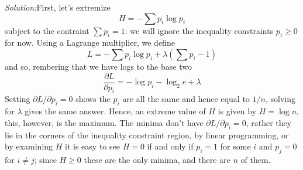 \documentclass[12pt]{article}
\newcommand{\soln}{\noindent\textit{Solution:}}
\begin{document}
\begin{enumerate}
\soln First, let's extremize 
\begin{equation}
H=-\sum p_i\log p_i
\end{equation}
subject to the contraint $\sum p_i=1$: we will ignore the inequality constraints $p_i\ge 0$ for now. Using a Lagrange multiplier, we define
\begin{equation}
L=-\sum p_i\log p_i+\lambda \left(\sum p_i-1\right)
\end{equation}
and so, rembering that we have logs to the base two
\begin{equation}
\frac{\partial L}{\partial p_i}=-\log p_i -\log_2e+\lambda
\end{equation}
Setting $\partial L/\partial p_i=0$ shows the $p_i$ are all the same
and hence equal to $1/n$, solving for $\lambda$ gives the same
answer. Hence, an extreme value of $H$ is given by $H=\log{n}$, this,
however, is the maximum. The minima don't have $\partial L/\partial
p_i=0$, rather they lie in the corners of the inequality constraint region, by linear programming, or by examining $H$ it is easy to see $H=0$ if and only if $p_i=1$ for some $i$ and $p_j=0$ for $i\not=j$; since $H\ge 0$ these are the only minima, and there are $n$ of them.



\end{enumerate}
\end{document}
